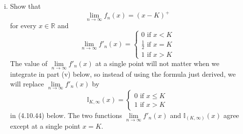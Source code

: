 \documentclass{article}
\newcommand{\R}{\mathbb{R}}
\newcommand{\limit}[1]{\underset{#1}{\lim}}
\theoremstyle{definition}
\theoremstyle{definition}
\begin{document}
\begin{enumerate}
\begin{enumerate}[(i)]
        \item Show that 
        $$ \limit{n \to \infty} f_n(x) = (x-K)^+$$
        for every $x \in \R$ and
        $$
        \limit{n \to \infty} f'_n(x) =
        \begin{cases}
            0 \text{ if } x < K \\
            \frac{1}{2} \text{ if } x = K \\
            1 \text{ if } x > K 
        \end{cases}
        $$
        The value of $\limit{n \to \infty} f'_n(x)$ at a single point will not matter when we integrate in part (v) below, so instead of using the formula just derived, we will replace $\limit{n \to \infty}f'_n(x)$ by 
        $$
        \mathbb{I}_{K,\infty}(x)=
        \begin{cases}
            0 \text{ if } x \le K \\
            1 \text{ if } x > K 
        \end{cases}
        $$
        in (4.10.44) below. The two functions $\limit{n \to \infty} f'_n(x)$ and $\mathbb{I}_{(K,\infty)}(x)$ agree except at a single point $x =K$.
        

\end{enumerate}
\end{enumerate}
\end{document}
